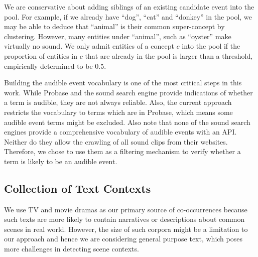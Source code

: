 We are conservative about adding siblings of an existing candidate event into
the pool. For example, if we already have ``dog'', ``cat'' and ``donkey''
in the pool, we may be able to deduce that ``animal'' is their common
super-concept by clustering.
However, many entities under ``animal'', such as ``oyster'' make virtually
no sound. We only admit entities of a concept $c$ into the pool if
the proportion of entities in $c$ that are already in the pool is larger
than a threshold, empirically determined to be 0.5.

Building the audible event vocabulary is one of the most critical steps in
this work. While Probase and the sound search engine provide indications
of whether a term is audible, they are not always reliable. Also, the current
approach restricts the vocabulary to terms which are in Probase, which means
some audible event terms might be excluded. 
Also note that none of the sound search engines provide a comprehensive
vocabulary of audible events with an API. Neither do they allow the crawling 
of all sound clips from their websites. Therefore, we chose to use them as 
a filtering mechanism to verify whether a term is likely to be an audible event.

%

\subsection{Collection of Text Contexts}
We use TV and movie dramas as our primary source of co-occurrences because
such texts are more likely to contain narratives or descriptions about
common scenes in real world. However, the size of such corpora might be a
limitation to our approach and hence we are considering general purpose 
text, which poses more challenges in detecting scene contexts. 

